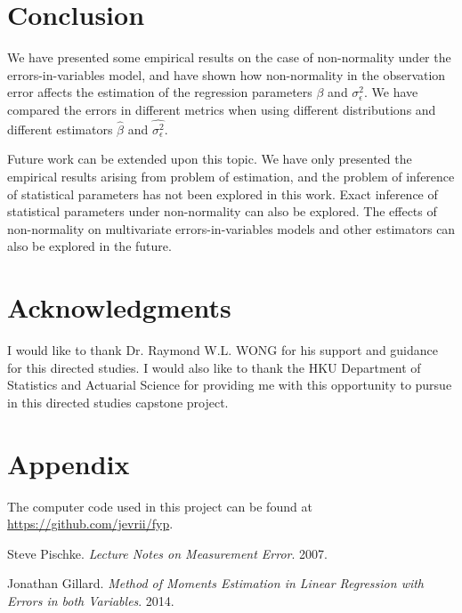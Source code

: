 \documentclass{article}
\begin{document}
\section{Conclusion}

We have presented some empirical results on the case of non-normality under the errors-in-variables model,
and have shown how non-normality in the observation error affects the estimation of the regression parameters $\beta$ and $\sigma^2_\epsilon$. 
We have compared the errors in different metrics when using different distributions and different estimators $\hat{\beta}$ and $\hat{\sigma^2_\epsilon}$.

Future work can be extended upon this topic.
We have only presented the empirical results arising from problem of estimation,
and the problem of inference of statistical parameters has not been explored in this work.
Exact inference of statistical parameters under non-normality can also be explored.
The effects of non-normality on multivariate errors-in-variables models and other estimators can also be explored in the future.

\section{Acknowledgments}

I would like to thank Dr. Raymond W.L. WONG for his support and guidance for this directed studies.
I would also like to thank the HKU Department of Statistics and Actuarial Science for providing me with this opportunity to pursue in this directed studies capstone project.

\section{Appendix}

The computer code used in this project can be found at \url{https://github.com/jevrii/fyp}.



\begin{thebibliography}{9}

    Steve Pischke.
    \textit{Lecture Notes on Measurement Error}.
    2007.

    Jonathan Gillard.
    \textit{Method of Moments Estimation in Linear Regression with Errors in both Variables}.
    2014.

\end{thebibliography}
\end{document}

